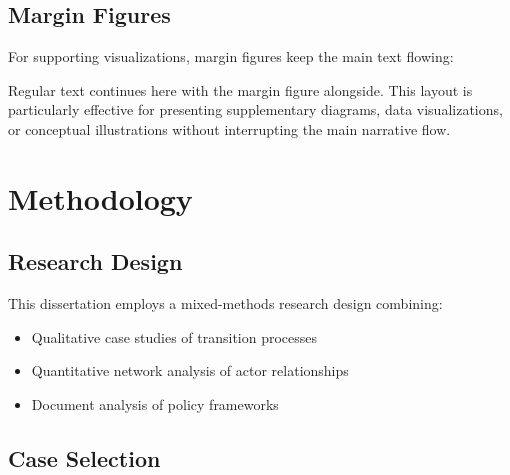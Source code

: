 \documentclass[
    fontsize=11pt,
    a4paper,
    twoside=true,
    open=any,
]{kaobook}
\begin{document}
\section{Margin Figures}

For supporting visualizations, margin figures keep the main text flowing:

\begin{marginfigure}
    \centering
    \caption{Niche development cycle}
\end{marginfigure}

Regular text continues here with the margin figure alongside. This layout is particularly effective for presenting supplementary diagrams, data visualizations, or conceptual illustrations without interrupting the main narrative flow.


\chapter{Methodology}

\margintoc

\section{Research Design}

This dissertation employs a mixed-methods research design combining:

\begin{eurbox}[title=Methods Overview]
\begin{itemize}
    \item Qualitative case studies of transition processes
    \item Quantitative network analysis of actor relationships
    \item Document analysis of policy frameworks
\end{itemize}
\end{eurbox}

\section{Case Selection}
\end{document}
